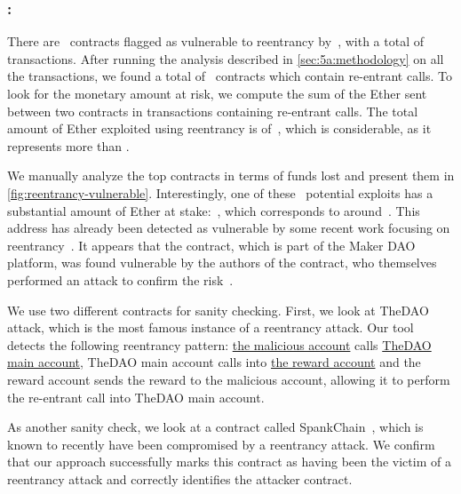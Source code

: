 \subsubsection{\vre: \reentrancy}
\label{ssec:analysis-re}
There are~ contracts flagged as vulnerable to reentrancy by~\cite{luu2016a,Tsankov2018,DBLP:conf/ndss/KalraGDS18}, with a total of~ transactions. After running the analysis described in \autoref{sec:5a:methodology} on all the transactions, we found a total of~ contracts which contain re-entrant calls. To look for the monetary amount at risk, we compute the sum of the Ether sent between two contracts in transactions containing re-entrant calls. The total amount of Ether exploited using reentrancy is of~, which is considerable, as it represents more than .

We manually analyze the top contracts in terms of funds lost and present them in \autoref{fig:reentrancy-vulnerable}. Interestingly, one of these~ potential exploits has a substantial amount of Ether at stake:~, which corresponds to around~. This address has already been detected as vulnerable by some recent work focusing on reentrancy~\cite{Rodler2019}. It appears that the contract, which is part of the Maker DAO~\cite{maker-dao} platform, was found vulnerable by the authors of the contract, who themselves performed an attack to confirm the risk~\cite{ds-eth-token}.

We use two different contracts for sanity checking.
First, we look at TheDAO attack, which is the most famous instance of a reentrancy attack. Our tool detects the following reentrancy pattern: \href{https://etherscan.io/address/0xc0ee9db1a9e07ca63e4ff0d5fb6f86bf68d47b89}{the malicious account} calls \href{https://etherscan.io/address/0xbb9bc244d798123fde783fcc1c72d3bb8c189413}{TheDAO main account}, TheDAO main account calls into \href{https://etherscan.io/address/0xd2e16a20dd7b1ae54fb0312209784478d069c7b0}{the reward account} and the reward account sends the reward to the malicious account, allowing it to perform the re-entrant call into TheDAO main account.

As another sanity check, we look at a contract called SpankChain~\cite{spank-chain}, which is known to recently have been compromised by a reentrancy attack. We confirm that our approach successfully marks this contract as having been the victim of a reentrancy attack and correctly identifies the attacker contract.

